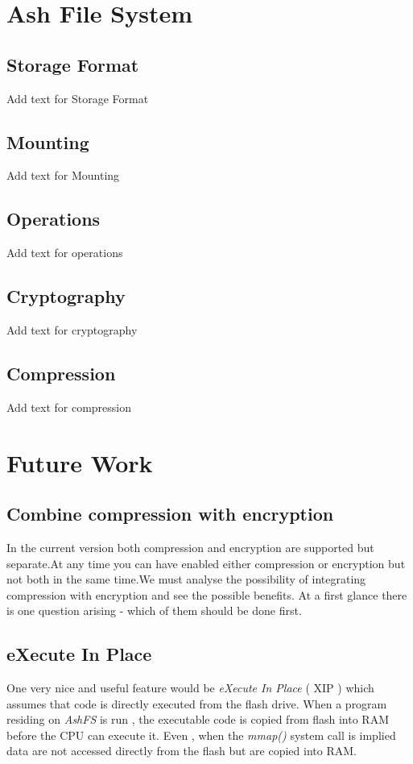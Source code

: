 \documentclass[conference]{IEEEtran}
\begin{document}
\section{Ash File System}

\subsection{Storage Format}
Add text for Storage Format

\subsection{Mounting}
Add text for Mounting 

\subsection{Operations}
Add text for operations

\subsection{Cryptography}

Add text for cryptography

\subsection{Compression}
Add text for compression

\section{Future Work}


\subsection{Combine compression with encryption}
In the current version both compression and encryption are supported but separate.At any time you can have 
enabled either compression or encryption but not both in the same time.We must analyse the possibility of 
integrating compression with encryption and see the possible benefits. At a first glance there is one question arising - which of them should be 
done first. 
\subsection{eXecute In Place}
One very nice and useful feature would be {\em eXecute In Place} ( XIP ) which assumes that code is
directly executed from the flash drive. When a program residing on {\em AshFS } is run , the executable
code is copied from flash into RAM before the CPU can execute it. Even , when the {\em mmap() } system 
call is implied data are not accessed directly from the flash but are copied into RAM. \\
\end{document}
